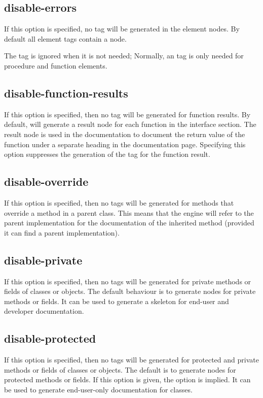 \subsection{disable-errors}
\label{suse:msdisableerrors}
If this option is specified, no  tag will be generated in the
element nodes. By default all element tags contain a  node.

The  tag is ignored when it is not needed; Normally, an 
 tag is only needed for procedure and function elements.

\subsection{disable-function-results}
\label{suse:disablefunctionresults}
If this option is specified, then no  tag will be generated for
function results. By default,  will generate a result node
for each function in the interface section. The result node is used in the
documentation to document the return value of the function under a separate
heading in the documentation page. Specifying this option suppresses the
generation of the  tag for the function result.

\subsection{disable-override}
\label{suse:disableoverride}
If this option is specified, then no  tags will be generated
for methods that override a method in a parent class. This means that the
 engine will refer to the parent implementation for the documentation
of the inherited method (provided it can find a parent implementation).


\subsection{disable-private}
\label{suse:disableprivate}
If this option is specified, then no  tags will be generated
for private methods or fields of classes or objects. 
The default behaviour is to generate nodes for private methods or fields.
It can be used to generate a skeleton for end-user and developer
documentation.

\subsection{disable-protected}
\label{suse:disableprotected}
If this option is specified, then no  tags will be generated
for protected and private methods or fields of classes or objects. 
The default is to generate nodes for protected methods or fields. If this
option is given, the option  is implied. It can be
used to generate end-user-only documentation for classes. 


